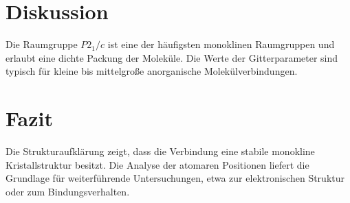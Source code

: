 \documentclass[11pt,a4paper,twocolumn]{article}
\begin{document}
\section*{Diskussion}

Die Raumgruppe $P2_1/c$ ist eine der häufigsten monoklinen Raumgruppen und erlaubt eine dichte Packung der Moleküle. Die Werte der Gitterparameter sind typisch für kleine bis mittelgroße anorganische Molekülverbindungen.

\section*{Fazit}

Die Strukturaufklärung zeigt, dass die Verbindung eine stabile monokline Kristallstruktur besitzt. Die Analyse der atomaren Positionen liefert die Grundlage für weiterführende Untersuchungen, etwa zur elektronischen Struktur oder zum Bindungsverhalten.
\end{document}
